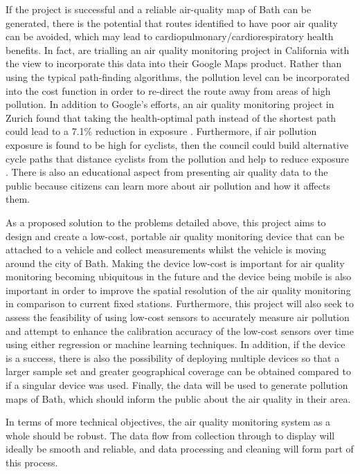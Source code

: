 \documentclass[11pt]{report}
\begin{document}
If the project is successful and a reliable air-quality map of Bath can be generated, there is the potential that routes identified to have poor air quality can be avoided, which may lead to cardiopulmonary/cardiorespiratory health benefits. In fact, \cite{Google2017EnvReport} are trialling an air quality monitoring project in California with the view to incorporate this data into their Google Maps product. Rather than using the typical path-finding algorithms, the pollution level can be incorporated into the cost function in order to re-direct the route away from areas of high pollution. In addition to Google's efforts, an air quality monitoring project in Zurich found that taking the health-optimal path instead of the shortest path could lead to a 7.1\% reduction in exposure \citep{Hasenfratz2015highresmapsTram}. Furthermore, if air pollution exposure is found to be high for cyclists, then the council could build alternative cycle paths that distance cyclists from the pollution and help to reduce exposure \citep{schepers2015bikepaths}. There is also an educational aspect from presenting air quality data to the public because citizens can learn more about air pollution and how it affects them. 

As a proposed solution to the problems detailed above, this project aims to design and create a low-cost, portable air quality monitoring device that can be attached to a vehicle and collect measurements whilst the vehicle is moving around the city of Bath. Making the device low-cost is important for air quality monitoring becoming ubiquitous in the future and the device being mobile is also important in order to improve the spatial resolution of the air quality monitoring in comparison to current fixed stations. Furthermore, this project will also seek to assess the feasibility of using low-cost sensors to accurately measure air pollution and attempt to enhance the calibration accuracy of the low-cost sensors over time using either regression or machine learning techniques. In addition, if the device is a success, there is also the possibility of deploying multiple devices so that a larger sample set and greater geographical coverage can be obtained compared to if a singular device was used. Finally, the data will be used to generate pollution maps of Bath, which should inform the public about the air quality in their area.


In terms of more technical objectives, the air quality monitoring system as a whole should be robust. The data flow from collection through to display will ideally be smooth and reliable, and data processing and cleaning will form part of this process. 
\end{document}
